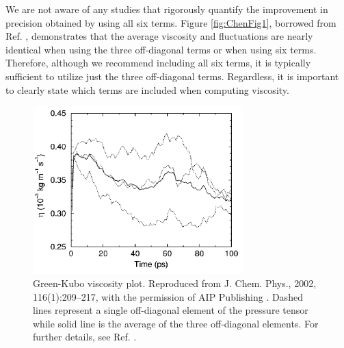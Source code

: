 \documentclass[9pt,bestpractices]{livecoms}
\begin{document}
We are not aware of any studies that rigorously quantify the improvement in precision obtained by using all six terms. Figure \ref{fig:ChenFig1}, borrowed from Ref. \cite{Chen2009}, demonstrates that the average viscosity and fluctuations are nearly identical when using the three off-diagonal terms or when using six terms. Therefore, although we recommend including all six terms, it is typically sufficient to utilize just the three off-diagonal terms. Regardless, it is important to clearly state which terms are included when computing viscosity.

\begin{figure}[htb!]
	\centering
	\includegraphics[width=3.2in]{HessFig5.png}
	\caption{Green-Kubo viscosity plot. Reproduced from J. Chem. Phys., 2002, 116(1):209--217, with the permission of AIP Publishing \cite{Hess2002}. Dashed lines represent a single off-diagonal element of the pressure tensor while solid line is the average of the three off-diagonal elements. For further details, see Ref. \cite{Hess2002}.}
	\label{fig:HessFig5}
\end{figure}
\end{document}
